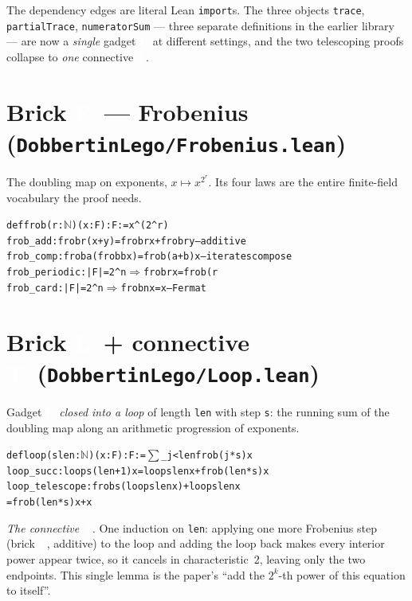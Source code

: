 \documentclass[11pt]{article}
\newenvironment{lean}{\begin{leanbox}\begin{alltt}\small}{\end{alltt}\end{leanbox}}
\newcommand{\bF}{{\colorbox{faceF}{\textcolor{white}{\scriptsize\bfseries F}}}}
\newcommand{\bL}{{\colorbox{faceL}{\textcolor{white}{\scriptsize\bfseries L}}}}
\newcommand{\bT}{{\colorbox{conn}{\textcolor{white}{\scriptsize\bfseries T}}}}
\newcommand{\ck}{\textcolor{grn}{\checkmark}}
\newcommand{\lc}[1]{\texttt{\small #1}}
\begin{document}
\noindent The dependency edges are literal Lean \lc{import}s. The three objects
\lc{trace}, \lc{partialTrace}, \lc{numeratorSum} --- three separate definitions
in the earlier library --- are now a \emph{single} gadget \bL\ at different
settings, and the two telescoping proofs collapse to \emph{one} connective \bT.

\section{Brick \bF\ --- Frobenius (\texttt{DobbertinLego/Frobenius.lean})}

The doubling map on exponents, $x\mapsto x^{2^r}$. Its four laws are the entire
finite-field vocabulary the proof needs.
\begin{lean}
def frob (r : \(\mathbb{N}\)) (x : F) : F := x ^ (2 ^ r)
frob_add     : frob r (x + y) = frob r x + frob r y          \ck  -- additive
frob_comp    : frob a (frob b x) = frob (a + b) x            \ck  -- iterates compose
frob_periodic: |F|=2^n \(\Rightarrow\) frob r x = frob (r %
frob_card    : |F|=2^n \(\Rightarrow\) frob n x = x                     \ck  -- Fermat
\end{lean}

\section{Brick \bL\ + connective \bT\ (\texttt{DobbertinLego/Loop.lean})}

Gadget \bF\ \emph{closed into a loop} of length \lc{len} with step \lc{s}: the
running sum of the doubling map along an arithmetic progression of exponents.
\begin{center}
\end{center}
\begin{lean}
def loop (s len : \(\mathbb{N}\)) (x : F) : F := \(\sum\)\_{j<len} frob (j*s) x
loop_succ     : loop s (len+1) x = loop s len x + frob (len*s) x       \ck
loop_telescope: frob s (loop s len x) + loop s len x
                  = frob (len*s) x + x                                 \ck  \bT
\end{lean}
\emph{The connective \bT.} One induction on \lc{len}: applying one more Frobenius
step (brick \bF, additive) to the loop and adding the loop back makes every
interior power appear twice, so it cancels in characteristic~2, leaving only the
two endpoints. This single lemma is the paper's ``add the $2^k$-th power of this
equation to itself''.
\end{document}
